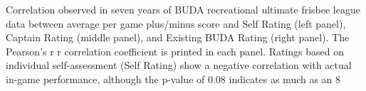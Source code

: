 Correlation observed in seven years of BUDA recreational ultimate frisbee league data between average per game plus/minus score and Self Rating (left panel), Captain Rating (middle panel), and Existing BUDA Rating (right panel). The Pearson’s r
r
 correlation coefficient is printed in each panel. Ratings based on individual self-assessment (Self Rating) show a negative correlation with actual in-game performance, although the p-value of 0.08 indicates as much as an 8%